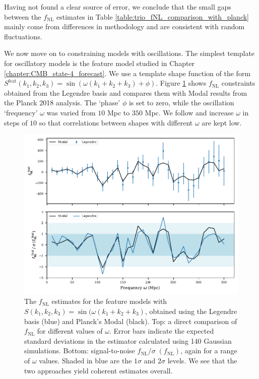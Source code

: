 Having not found a clear source of error, we conclude that the small gaps between the $f_\text{NL}$ estimates in Table \ref{table:trio_fNL_comparison_with_planck} mainly come from differences in methodology and are consistent with random fluctuations.

We now move on to constraining models with oscillations. The simplest template for oscillatory models is the feature model studied in Chapter \ref{chapter:CMB_state-4_forecast}. We use a template shape function of the form $S^\text{feat}(k_1,k_2,k_3) = \sin(\omega (k_1 + k_2 + k_3) + \phi)$. Figure \ref{fig:sine_template_frequency_Legendre_Modal} shows $f_\text{NL}$ constraints obtained from the Legendre basis and compares them with Modal results from the Planck 2018 analysis. The `phase' $\phi$ is set to zero, while the oscillation `frequency' $\omega$ was varied from $10$ Mpc to $350$ Mpc. We follow \cite{Fergusson2015a} and increase $\omega$ in steps of $10$ so that correlations between shapes with different $\omega$ are kept low.

\begin{figure}[htbp!] 
	\centering    
	\includegraphics{sine_template_frequency_Legendre_Modal.pdf}
	\caption{The $f_\text{NL}$ estimates for the feature models with $S(k_1,k_2,k_3) = \sin(\omega (k_1 + k_2 + k_3)$, obtained using the Legendre basis (blue) and Planck's Modal (black). Top: a direct comparison of $f_\text{NL}$ for different values of $\omega$. Error bars indicate the expected standard deviations in the estimator calculated using 140 Gaussian simulations. Bottom: signal-to-noise $f_\text{NL}/\sigma\;(f_\text{NL})$, again for a range of $\omega$ values. Shaded in blue are the $1\sigma$ and $2\sigma$ levels. We see that the two approaches yield coherent estimates overall.}
	\label{fig:sine_template_frequency_Legendre_Modal}
\end{figure}

